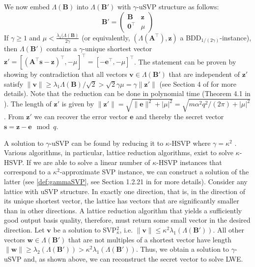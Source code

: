 We now embed $\Lambda(\mathbf{B})$ into $\Lambda(\mathbf{B}')$ with $\gamma$-uSVP structure as follows: %
\begin{equation}
  \mathbf{B}' = \begin{pmatrix}
    \mathbf{B}           & \mathbf{z} \\
    \mathbf{0}^\intercal & \mu
  \end{pmatrix}
\end{equation}
If $\gamma \geq 1$ and $\mu < \frac{\lambda_1(\Lambda(\mathbf{B})}{2\gamma}$ (or equivalently, $(\Lambda(\mathbf{A}^\intercal), \mathbf{z})$ a BDD$_{1/(2\gamma)}$-instance), then $\Lambda(\mathbf{B}')$ contains a $\gamma$-unique shortest vector $\mathbf{z}' = \left[(\mathbf{A}^\intercal\mathbf{s} - \mathbf{z})^\intercal, -\mu\right]^\intercal = \left[-\mathbf{e}^\intercal, -\mu\right]^\intercal$.
The statement can be proven by showing by contradiction that all vectors $\mathbf{v} \in \Lambda(\mathbf{B}')$ that are independent of $\mathbf{z}'$ satisfy $\| \mathbf{v}\| \geq \lambda_1{\Lambda(\mathbf{B})}/\sqrt{2} > \sqrt{2}\gamma \mu = \gamma \|\mathbf{z}'\|$ (see Section 4 of \cite{LM09} for more details). Note that the reduction can be done in polynomial time (Theorem 4.1 in \cite{LM09}). %
The length of $\mathbf{z}'$ is given by $\|\mathbf{z}'\| = \sqrt{\|\mathbf{e}\|^2 + | \mu |^2} = \sqrt{m\alpha^2 q^2/(2\pi) + | \mu |^2}$ \cite{BBGS19}. From $\mathbf{z}'$ we can recover the error vector $\mathbf{e}$ and thereby the secret vector $\mathbf{s} = \mathbf{z} - \mathbf{e} \mod q$.

A solution to $\gamma$-uSVP can be found by reducing it to $\kappa$-HSVP where $\gamma = \kappa^2$ \cite{APS15}. Various algorithms, in particular, lattice reduction algorithms, exist to solve $\kappa$-HSVP. If we are able to solve a linear number of $\kappa$-HSVP instances that correspond to a $\kappa^2$-approximate SVP instance, we can construct a solution of the latter (see \cref{def:gammaSVP}, see Section 1.2.21 in \cite{Lov87} for more details).
Consider any lattice with uSVP structure. In exactly one direction, that is, in the direction of its unique shortest vector, the lattice has vectors that are significantly smaller than in other directions. A lattice reduction algorithm that yields a sufficiently good output basis quality, therefore, must return some small vector in the desired direction.
Let $\mathbf{v}$ be a solution to SVP$_\kappa^2$, i.e. $\|\mathbf{v}\| \leq \kappa^2 \lambda_1(\Lambda(\mathbf{B}'))$. All other vectors $\mathbf{w}\in \Lambda(\mathbf{B}')$ that are not multiples of a shortest vector have length $\|\mathbf{w}\| \geq \lambda_2(\Lambda(\mathbf{B}')) > \kappa^2\lambda_1(\Lambda(\mathbf{B}'))$. Thus, we obtain a solution to $\gamma$-uSVP and, as shown above, we can reconstruct the secret vector to solve LWE.

